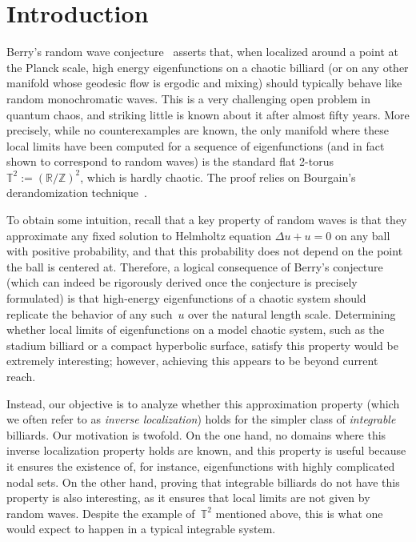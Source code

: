 \documentclass{amsart}
\theoremstyle{definition}
\theoremstyle{remark}
\def\RR{\mathbb{R}}
\def\ZZ{\mathbb{Z}}
\numberwithin{equation}{section}
\theoremstyle{definition}
\theoremstyle{remark}
\def\RR{\mathbb{R}}
\def\ZZ{\mathbb{Z}}
\begin{document}
\section{Introduction}\label{Intro}

Berry's random wave conjecture~\cite{Be77} asserts that, when localized around a point at the Planck scale, high energy eigenfunctions on a chaotic billiard (or on any other manifold whose geodesic flow is ergodic and mixing) should typically behave like random monochromatic waves. This is a very challenging open problem in quantum chaos, and striking little is known about it after almost fifty years. More precisely, while no counterexamples are known, the only manifold where these local limits have been computed for a sequence of eigenfunctions (and in fact shown to correspond to random waves) is the standard flat 2-torus $\mathbb T^2:=(\RR/\ZZ)^2$, which is hardly chaotic. The proof relies on Bourgain's derandomization technique~\cite{Bourgain}.

To obtain some intuition, recall that a key property of random waves is that they approximate any fixed solution to Helmholtz equation $\Delta u + u=0$ on any ball with positive probability, and that this probability does not depend on the point the ball is centered at. Therefore, a logical consequence of Berry's conjecture (which can indeed be rigorously derived once the conjecture is precisely formulated) is that high-energy eigenfunctions of a chaotic system should replicate the behavior of any such~$u$ over the natural length scale. Determining whether local limits of eigenfunctions on a model chaotic system, such as the stadium billiard or a compact hyperbolic surface,  satisfy this property would be extremely interesting; however, achieving this appears to be beyond current reach.

Instead, our objective is to analyze whether this approximation property (which we often refer to as {\em inverse localization}\/) holds for the simpler class of {\em integrable}\/ billiards. Our motivation is twofold. On the one hand, no domains where this inverse localization property holds are known, and this property is useful because it ensures the existence of, for instance, eigenfunctions with highly complicated nodal sets. On the other hand, proving that integrable billiards do not have this property is also interesting, as it ensures that local limits are not given by random waves. Despite the example of~$\mathbb T^2$ mentioned above, this is what one would expect to happen in a typical integrable system.
\end{document}
